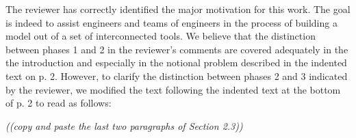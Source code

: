 \documentclass{aiaa-tc}
\begin{document}
The reviewer has correctly identified the major motivation for this work. The goal is indeed to 
assist engineers and teams of engineers in the process of building a model out of a set of interconnected 
tools. 
We believe that the distinction between phases 1 and 2 in the reviewer's  comments are covered adequately 
in the the introduction and especially in the notional problem described in the indented text on p. 2.
However, to clarify the distinction between phases 2 and 3 indicated by the reviewer, we modified the text following the indented text at the bottom of p. 2 to read as follows:

\emph{ ((copy and paste the last two paragraphs of Section 2.3))}
\end{document}
